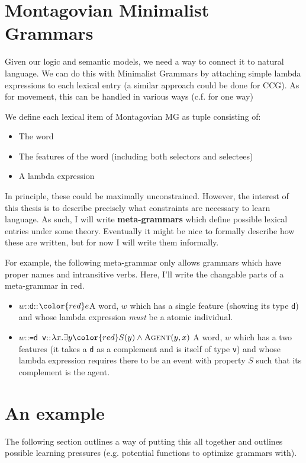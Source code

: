 \documentclass[11pt, a4paper]{article}
\newcommand{\lex}[3]{{#1}::{\texttt{#2}}::{$#3$}}
\begin{document}
\section{Montagovian Minimalist Grammars}
Given our logic and semantic models, we need a way to connect it to natural language.
We can do this with Minimalist Grammars by attaching simple lambda expressions to each lexical entry (a similar approach could be done for CCG). 
As for movement, this can be handled in various ways (c.f. \cite{kobele_importing_2012} for one way)

We define each lexical item of Montagovian MG as tuple consisting of:
\begin{itemize}
  \item The word
  \item The features of the word (including both selectors and selectees)
  \item A lambda expression 
\end{itemize}

In principle, these could be maximally unconstrained. 
However, the interest of this thesis is to describe precisely what constraints are necessary to learn language. 
As such, I will write \textbf{meta-grammars} which define possible lexical entries under some theory. 
Eventually it might be nice to formally describe how these are written, but for now I will write them informally. 

For example, the following meta-grammar only allows grammars which have proper names and intransitive verbs. 
Here, I'll write the changable parts of a meta-grammar in {\color{red} red}.
\begin{itemize}
  \item \lex{\color{red} $w$}{d}{\color{red} e}\hspace{2em}A word, $w$  which has a single feature (showing its type \texttt{d}) and whose lambda expression \emph{must} be a atomic individual.
  \item \lex{\color{red}$w$}{=d v}{\lambda x. \exists y {\color{red}S}(y)\land \textsc{Agent}(y, x)}\hspace{2em} A word, $w$ which has a two features (it takes a \texttt{d} as a complement and is itself of type \texttt{v}) and whose lambda expression requires there to be an event with property $S$ such that its complement is the agent.
\end{itemize}


\section{An example}
The following section outlines a way of putting this all together and outlines possible learning pressures (e.g. potential functions to optimize grammars with).
\end{document}
